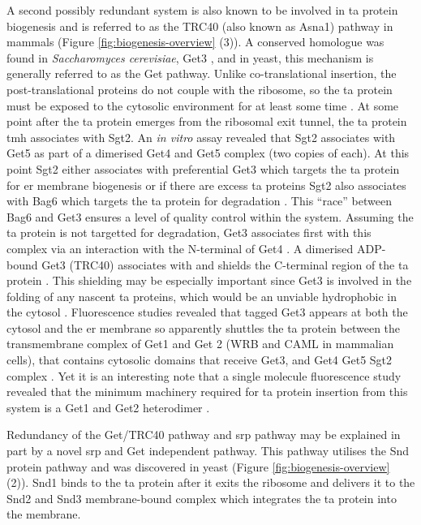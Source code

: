 A second possibly redundant system is also known to be involved in \gls{ta} protein biogenesis and is referred to as the TRC40 (also known as Asna1) pathway in mammals (Figure \ref{fig:biogenesis-overview} (3)).
A conserved homologue was found in \textit{Saccharomyces cerevisiae}, Get3 \cite{Schuldiner2008}, and in yeast, this mechanism is generally referred to as the Get pathway.
Unlike co-translational insertion, the post-translational proteins do not couple with the ribosome, so the \gls{ta} protein must be exposed to the cytosolic environment for at least some time \cite{Guna2018}.
At some point after the \gls{ta} protein emerges from the ribosomal exit tunnel, the \gls{ta} protein \gls{tmh} associates with Sgt2.
An \textit{in vitro} assay revealed that Sgt2 associates with Get5  \cite{Wang2010} as part of a dimerised Get4 and Get5 complex (two copies of each)\cite{Chang2010, Chang2012, Chartron2010, Chartron2012}.
At this point Sgt2 either associates with preferential Get3 which targets the \gls{ta} protein for \gls{er} membrane biogenesis or if there are excess \gls{ta} proteins Sgt2 also associates with Bag6 which targets the \gls{ta} protein for degradation \cite{Shao2017}.
This ``race'' between Bag6 and Get3 ensures a level of quality control within the system.
Assuming the \gls{ta} protein is not targetted for degradation, Get3 associates first with this complex via an interaction with the N-terminal of Get4 \cite{Wang2010}.
A dimerised ADP-bound Get3 \cite{Mateja2009, Hu2009, Bozkurt2009, Suloway2009, Yamagata2009} (TRC40) associates with and shields the C-terminal region of the \gls{ta} protein \cite{Stefanovic2007, Schuldiner2008, Favaloro2008}.
This shielding may be especially important since Get3 is involved in the folding of any nascent \gls{ta} proteins, which would be an unviable hydrophobic in the cytosol \cite{Jonikas2009}.
Fluorescence studies revealed that tagged Get3 appears at both the cytosol and the \gls{er} membrane so apparently shuttles the \gls{ta} protein between the transmembrane complex of Get1 and Get 2 (WRB and CAML in mammalian cells), that contains cytosolic domains that receive Get3, and Get4 Get5 Sgt2 complex \cite{Huh2003, Zalisko2017}.
Yet it is an interesting note that a single molecule fluorescence study revealed that the minimum machinery required for \gls{ta} protein insertion from this system is a Get1 and Get2 heterodimer \cite{Zalisko2017}.

Redundancy of the Get/TRC40 pathway and \gls{srp} pathway may be explained in part by a novel \gls{srp} and Get independent pathway.
This pathway utilises the Snd protein pathway and was discovered in yeast \cite{Aviram2016} (Figure \ref{fig:biogenesis-overview} (2)).
Snd1 binds to the \gls{ta} protein after it exits the ribosome and delivers it to the Snd2 and Snd3 membrane\--bound complex which integrates the \gls{ta} protein into the membrane.

